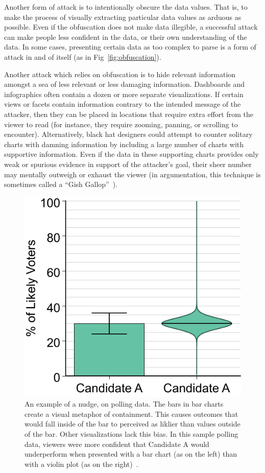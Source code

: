 \documentclass{vgtc}                          %
\begin{document}
Another form of attack is to intentionally obscure the data values. That is, to make the process of visually extracting particular data values as arduous as possible. Even if the obfuscation does not make data illegible, a successful attack can make people less confident in the data, or their own understanding of the data. In some cases, presenting certain data as too complex to parse is a form of attack in and of itself (as in Fig~\ref{fig:obfuscation}).

Another attack which relies on obfuscation is to hide relevant information amongst a sea of less relevant or less damaging information. Dashboards and infographics often contain a dozen or more separate visualizations. If certain views or facets contain information contrary to the intended message of the attacker, then they can be placed in locations that require extra effort from the viewer to read (for instance, they require zooming, panning, or scrolling to encounter). Alternatively, black hat designers could attempt to counter solitary charts with damning information by including a large number of charts with supportive information. Even if the data in these supporting charts provides only weak or spurious evidence in support of the attacker's goal, their sheer number may mentally outweigh or exhaust the viewer (in argumentation, this technique is sometimes called a ``Gish Gallop''~\cite{gish}).

\begin{figure}
	\centering
	\includegraphics[width=0.45\columnwidth]{pictures/within}
	\caption{An example of a nudge, on polling data. The bars in bar charts create a visual metaphor of containment. This causes outcomes that would fall inside of the bar to perceived as liklier than values outside of the bar. Other visualizations lack this bias. In this sample polling data, viewers were more confident that Candidate A would underperform when presented with a bar chart (as on the left) than with a violin plot (as on the right)~\protect\cite{correll2014error}.}
	\label{fig:nudge}
\end{figure}
\end{document}
